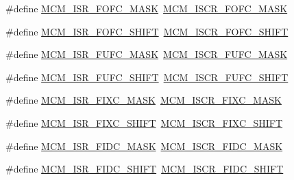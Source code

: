 \begin{DoxyCompactItemize}
\item 
\#define \mbox{\hyperlink{group___s_d_k___compatibility___symbols_ga90b5519e0a496915707fc7c62a13a70a}{M\+C\+M\+\_\+\+I\+S\+R\+\_\+\+F\+O\+F\+C\+\_\+\+M\+A\+SK}}~\mbox{\hyperlink{group___m_c_m___register___masks_ga4bf392796fdb8f19596f1831b9305443}{M\+C\+M\+\_\+\+I\+S\+C\+R\+\_\+\+F\+O\+F\+C\+\_\+\+M\+A\+SK}}
\item 
\#define \mbox{\hyperlink{group___s_d_k___compatibility___symbols_ga2140808617bd0d532f24a58a16eb87d7}{M\+C\+M\+\_\+\+I\+S\+R\+\_\+\+F\+O\+F\+C\+\_\+\+S\+H\+I\+FT}}~\mbox{\hyperlink{group___m_c_m___register___masks_ga87dd8b57048fbcd5dd6d8d7d6cb037f0}{M\+C\+M\+\_\+\+I\+S\+C\+R\+\_\+\+F\+O\+F\+C\+\_\+\+S\+H\+I\+FT}}
\item 
\#define \mbox{\hyperlink{group___s_d_k___compatibility___symbols_ga57b83edf81529b3aeb0bcd71246d94db}{M\+C\+M\+\_\+\+I\+S\+R\+\_\+\+F\+U\+F\+C\+\_\+\+M\+A\+SK}}~\mbox{\hyperlink{group___m_c_m___register___masks_ga1d21eead21628e992564620393e8ebf0}{M\+C\+M\+\_\+\+I\+S\+C\+R\+\_\+\+F\+U\+F\+C\+\_\+\+M\+A\+SK}}
\item 
\#define \mbox{\hyperlink{group___s_d_k___compatibility___symbols_gaba14f9ecb4d3e66eae0b4bf05d89bbdb}{M\+C\+M\+\_\+\+I\+S\+R\+\_\+\+F\+U\+F\+C\+\_\+\+S\+H\+I\+FT}}~\mbox{\hyperlink{group___m_c_m___register___masks_ga2fed77fb78e7bc8ae312713ef58d263a}{M\+C\+M\+\_\+\+I\+S\+C\+R\+\_\+\+F\+U\+F\+C\+\_\+\+S\+H\+I\+FT}}
\item 
\#define \mbox{\hyperlink{group___s_d_k___compatibility___symbols_ga6d8f4bf99ae7ee26a509ebe76c2ddb78}{M\+C\+M\+\_\+\+I\+S\+R\+\_\+\+F\+I\+X\+C\+\_\+\+M\+A\+SK}}~\mbox{\hyperlink{group___m_c_m___register___masks_gabe836f6795a2a2a95ff9b6a64d9a24fe}{M\+C\+M\+\_\+\+I\+S\+C\+R\+\_\+\+F\+I\+X\+C\+\_\+\+M\+A\+SK}}
\item 
\#define \mbox{\hyperlink{group___s_d_k___compatibility___symbols_ga2655b9e638b37e397318822fad7cf222}{M\+C\+M\+\_\+\+I\+S\+R\+\_\+\+F\+I\+X\+C\+\_\+\+S\+H\+I\+FT}}~\mbox{\hyperlink{group___m_c_m___register___masks_ga5c1b020ff2a6d0d96bf62556bb035fcd}{M\+C\+M\+\_\+\+I\+S\+C\+R\+\_\+\+F\+I\+X\+C\+\_\+\+S\+H\+I\+FT}}
\item 
\#define \mbox{\hyperlink{group___s_d_k___compatibility___symbols_gae47ebe0808b7997f475825af2dfe3636}{M\+C\+M\+\_\+\+I\+S\+R\+\_\+\+F\+I\+D\+C\+\_\+\+M\+A\+SK}}~\mbox{\hyperlink{group___m_c_m___register___masks_gaeca36bf639a606a24f7ee6a4fc983528}{M\+C\+M\+\_\+\+I\+S\+C\+R\+\_\+\+F\+I\+D\+C\+\_\+\+M\+A\+SK}}
\item 
\#define \mbox{\hyperlink{group___s_d_k___compatibility___symbols_ga950f918e04715fa01ac699606ae0e803}{M\+C\+M\+\_\+\+I\+S\+R\+\_\+\+F\+I\+D\+C\+\_\+\+S\+H\+I\+FT}}~\mbox{\hyperlink{group___m_c_m___register___masks_gaaf16fcce0e380e7f200d910008794028}{M\+C\+M\+\_\+\+I\+S\+C\+R\+\_\+\+F\+I\+D\+C\+\_\+\+S\+H\+I\+FT}}

\end{DoxyCompactItemize}
